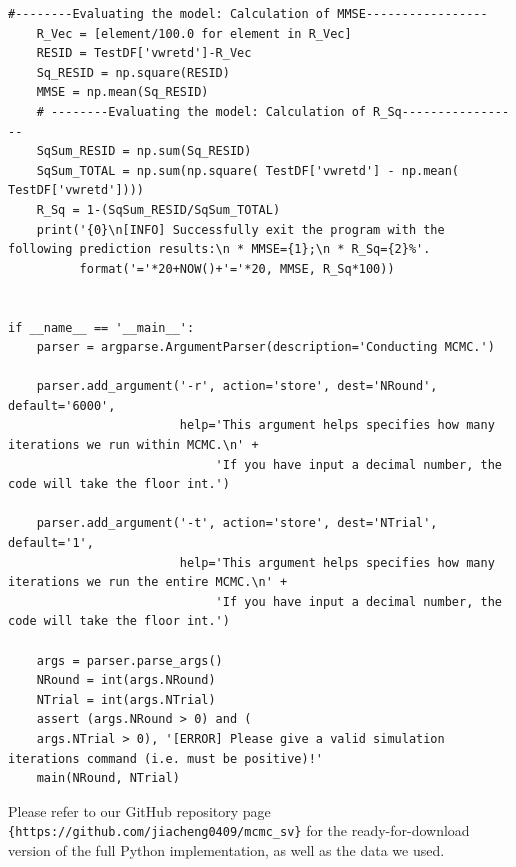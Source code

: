 \documentclass[letterpaper]{article}
\begin{document}
\begin{lstlisting}[label=lst:pythoncode]
    #--------Evaluating the model: Calculation of MMSE-----------------
    R_Vec = [element/100.0 for element in R_Vec]
    RESID = TestDF['vwretd']-R_Vec
    Sq_RESID = np.square(RESID)
    MMSE = np.mean(Sq_RESID)
    # --------Evaluating the model: Calculation of R_Sq-----------------
    SqSum_RESID = np.sum(Sq_RESID)
    SqSum_TOTAL = np.sum(np.square( TestDF['vwretd'] - np.mean( TestDF['vwretd'])))
    R_Sq = 1-(SqSum_RESID/SqSum_TOTAL)
    print('{0}\n[INFO] Successfully exit the program with the following prediction results:\n * MMSE={1};\n * R_Sq={2}%'.
          format('='*20+NOW()+'='*20, MMSE, R_Sq*100))


if __name__ == '__main__':
    parser = argparse.ArgumentParser(description='Conducting MCMC.')

    parser.add_argument('-r', action='store', dest='NRound', default='6000',
                        help='This argument helps specifies how many iterations we run within MCMC.\n' +
                             'If you have input a decimal number, the code will take the floor int.')

    parser.add_argument('-t', action='store', dest='NTrial', default='1',
                        help='This argument helps specifies how many iterations we run the entire MCMC.\n' +
                             'If you have input a decimal number, the code will take the floor int.')

    args = parser.parse_args()
    NRound = int(args.NRound)
    NTrial = int(args.NTrial)
    assert (args.NRound > 0) and (
    args.NTrial > 0), '[ERROR] Please give a valid simulation iterations command (i.e. must be positive)!'
    main(NRound, NTrial)
\end{lstlisting}
Please refer to our GitHub repository page \verb!{https://github.com/jiacheng0409/mcmc_sv}! for the ready-for-download version of the full Python implementation, as well as the data we used.


\newpage



\end{document}
